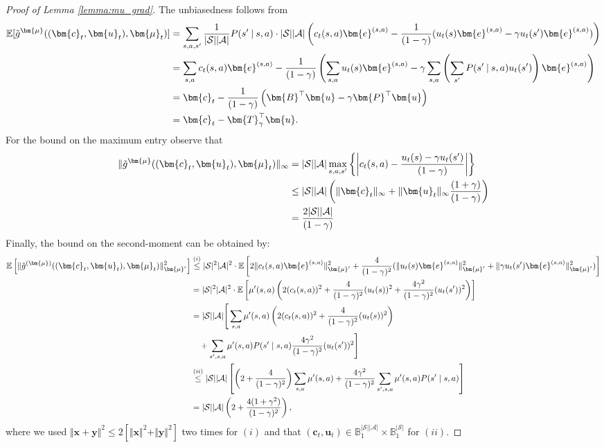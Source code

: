\documentclass[10pt]{article} %
\def\Ac{\ensuremath{\mathcal{A}}}
\def\mB{{\bm{B}}}
\def\mP{{\bm{P}}}
\def\mTg{{\bm{T}}_\gamma}
\def\vc{{\bm{c}}}
\def\ve{{\bm{e}}}
\def\vu{{\bm{u}}}
\def\vx{{\bm{x}}}
\def\vy{{\bm{y}}}
\def\vmu{{\bm{\mu}}}
\def\evc{{c}}
\def\evu{{u}}
\def\evmu{{\mu}}
\def\sB{{\mathbb{B}}}
\newcommand{\E}{\mathbb{E}}
\newcommand{\St}{\mathcal{S}}
\begin{document}
\begin{proof}[Proof of Lemma \ref{lemma:mu_grad}]
    The unbiasedness follows from
    \begin{align*}
        \E[\Tilde{g}^{\vmu}((\vc_t,\vu_t),\vmu_t)] &= \sum\limits_{s,a,s'}\frac{1}{|\St||\Ac|}P(s'\:|\:s,a)\cdot|\St||\Ac|\left(\evc_t(s,a)\ve^{(s,a)} - \frac{1}{(1-\gamma)}(\evu_t(s)\ve^{(s,a)}-\gamma\evu_t(s')\ve^{(s,a)})\right)\\
        &= \sum\limits_{s,a}\evc_t(s,a)\ve^{(s,a)} - \frac{1}{(1-\gamma)}\left(\sum\limits_{s,a}\evu_t(s)\ve^{(s,a)}-\gamma\sum\limits_{s,a}\left(\sum\limits_{s'}P(s'\:|\:s,a)\evu_t(s')\right)\ve^{(s,a)}\right)\\
        &= \vc_t - \frac{1}{(1-\gamma)}\left(\mB^\top\vu - \gamma\mP^\top\vu\right)\\
        &= \vc_t - \mTg^\top \vu.
    \end{align*}
    For the bound on the maximum entry observe that
    \begin{align*}
        \Vert \Tilde{g}^{\vmu} ((\vc_t,\vu_t),\vmu_t) \Vert_\infty &= |\St||\Ac|\max_{s,a,s'}\left\{\bigg\vert \evc_t(s,a) - \frac{\evu_t(s) - \gamma \evu_t(s')}{(1-\gamma)} \bigg\vert\right\}\\
        &\leq |\St||\Ac|\left(\Vert \vc_t \Vert_\infty + \Vert\vu_t\Vert_\infty\frac{(1+\gamma)}{(1-\gamma)}\right)\\
        &= \frac{2|\St||\Ac|}{(1-\gamma)}
    \end{align*}
    Finally, the bound on the second-moment can be obtained by:
    \begin{align*}
        \E\left[ \Vert \Tilde{g}^{(\vmu)}((\vc_t,\vu_t),\vmu_t) \Vert^2_{\vmu'} \right] &\stackrel{(i)}{\leq} |\St|^2|\Ac|^2\cdot\E \left[ 2\Vert \evc_t(s,a)\ve^{(s,a)}\Vert^2_{\vmu'} + \frac{4}{(1-\gamma)^2}(\Vert \evu_t(s)\ve^{(s,a)}\Vert^2_{\vmu'} + \Vert \gamma \evu_t(s')\ve^{(s,a)}\Vert^2_{\vmu'})\right] \\
        &=  |\St|^2|\Ac|^2\cdot \E \left[ \evmu'(s,a)\left(2(\evc_t(s,a))^2 + \frac{4}{(1-\gamma)^2}(\evu_t(s))^2 + \frac{4\gamma^2}{(1-\gamma)^2}(\evu_t(s'))^2\right) \right] \\
        &= |\St||\Ac|\Bigg[\sum\limits_{s,a}\evmu'(s,a)\left(2(\evc_t(s,a))^2 + \frac{4}{(1-\gamma)^2}(\evu_t(s))^2\right)\\
        &\quad + \sum\limits_{s',s,a}\evmu'(s,a)P(s'\mid s,a)\frac{4\gamma^2}{(1-\gamma)^2}(\evu_t(s'))^2 \Bigg]\\
        &\stackrel{(ii)}{\leq} |\St||\Ac|\left[\left(2 + \frac{4}{(1-\gamma)^2}\right) \sum\limits_{s,a}\evmu'(s,a) +\frac{4\gamma^2}{(1-\gamma)^2}\sum\limits_{s',s,a}\evmu'(s,a)P(s'\mid s,a)\right]\\
        &= |\St||\Ac|\left(2 + \frac{4(1+\gamma^2)}{(1-\gamma)^2}\right),
    \end{align*}
    where we used $\Vert \vx+ \vy\Vert^2 \leq 2[\Vert \vx \Vert^2 + \Vert \vy \Vert^2]$ two times for $(i)$ and that $(\vc_t,\vu_t) \in \sB^{|\St||\Ac|}_{1}\times \sB^{|\St|}_{1} $ for $(ii)$. 
\end{proof}
\end{document}

